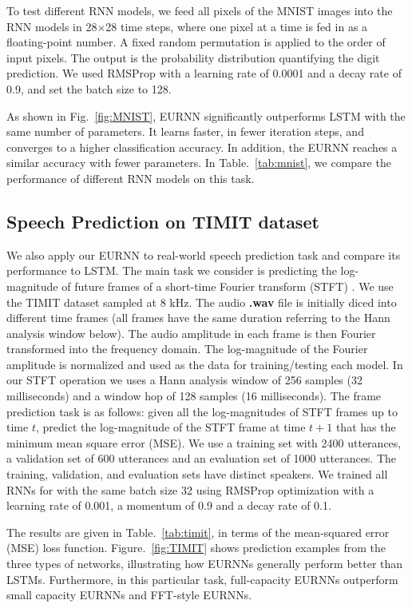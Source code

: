 To test different RNN models, we feed all pixels of the MNIST images into the RNN models in 28$\times$28 time steps, where one pixel at a time is fed in as a floating-point number. A fixed random permutation is applied to the order of input pixels. The output is the probability distribution quantifying the digit prediction. We used RMSProp with a learning rate of 0.0001 and a decay rate of 0.9, and set the batch size to 128. 

As shown in Fig.~\ref{fig:MNIST}, EURNN significantly outperforms LSTM with the same number of parameters. It learns faster, in fewer iteration steps, and converges to a higher classification accuracy. In addition, the EURNN reaches a similar accuracy with fewer parameters. In Table.~\ref{tab:mnist}, we compare the performance of different RNN models on this task.

\subsection{Speech Prediction on TIMIT dataset}

We also apply our EURNN to real-world speech prediction task and compare its performance to LSTM. The main task we consider is predicting the log-magnitude of future frames of a short-time Fourier transform (STFT) \cite{wisdom2016full,SEJDIC2009153}. We use the TIMIT dataset \cite{garofolo1993darpa} sampled at 8 kHz. The audio \textbf{.wav} file is initially diced into different time frames (all frames have the same duration referring to the Hann analysis window below). The audio amplitude  in each frame is then Fourier transformed into the frequency domain. The log-magnitude of the Fourier amplitude is normalized and used as the data for training/testing each model. In our STFT operation we uses a Hann analysis window of 256 samples (32 milliseconds) and a window hop of 128 samples (16 milliseconds). The frame prediction task is as follows: given all the log-magnitudes of STFT frames up to time $t$, predict the log-magnitude of the STFT frame at time $t + 1$ that has the minimum mean square error (MSE). We use a training set with 2400 utterances, a validation set of 600 utterances and an evaluation set of 1000 utterances. The training, validation, and evaluation sets have distinct speakers. We trained all RNNs for with the same batch size 32 using RMSProp optimization with a learning rate of 0.001, a momentum of 0.9 and a decay rate of 0.1.

The results are given in Table.~\ref{tab:timit}, in terms of the mean-squared error (MSE) loss function. Figure.~\ref{fig:TIMIT} shows prediction examples from the three types of networks, illustrating how EURNNs generally perform better than LSTMs. Furthermore, in this particular task, full-capacity EURNNs outperform small capacity EURNNs and FFT-style EURNNs.

